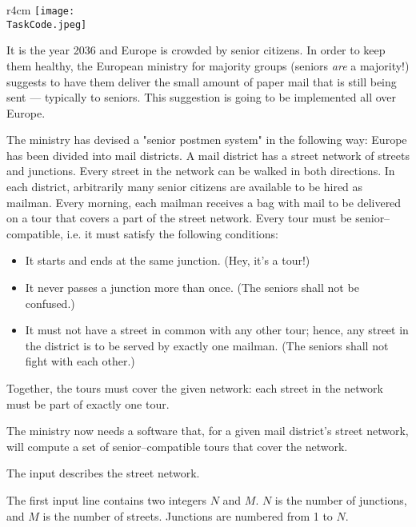 \documentclass{boi2014}
\renewcommand{\TaskCode}{postmen}
\begin{document}
    \begin{wrapfigure}[8]{r}{4cm}
        \vspace{-18pt}
		\texttt{[image: \\TaskCode.jpeg]}
	\end{wrapfigure}
    It is the year 2036 and Europe is crowded by senior citizens. In order to
    keep them healthy, the European ministry for majority groups (seniors
    \emph{are} a majority!) suggests to have them deliver the small amount of
    paper mail that is still being sent --- typically to seniors. This
    suggestion is going to be implemented all over Europe.

    The ministry has devised a "senior postmen system" in the following way:
    Europe has been divided into mail districts. A mail district has a street
    network of streets and junctions. Every street in the network can be walked
    in both directions. In each district, arbitrarily many senior citizens are
    available to be hired as mailman. Every morning, each mailman receives a bag
    with mail to be delivered on a tour that covers a part of the street
    network. Every tour must be senior--compatible, i.e. it must satisfy the
    following conditions:

    \begin{itemize}
        \item It starts and ends at the same junction. (Hey, it’s a tour!)
        \item It never passes a junction more than once. (The seniors shall not
        be confused.)
        \item It must not have a street in common with any other tour; hence,
        any street in the district is to be served by exactly one mailman. (The
        seniors shall not fight with each other.)
    \end{itemize}

    Together, the tours must cover the given network: each street in the network
    must be part of exactly one tour.

    \Task
    The ministry now needs a software that, for a given mail district’s street
    network, will compute a set of senior--compatible tours that cover the
    network.

    \Input
    The input describes the street network.

    The first input line contains two integers $N$ and $M$. $N$ is the number of
    junctions, and $M$ is the number of streets. Junctions are numbered from 1
    to $N$.
\end{document}
